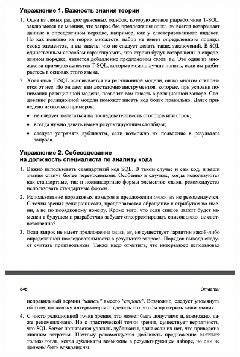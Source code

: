 \begin{figure}[h!]
	\begin{center}
		\includegraphics[width=0.9\textwidth]{img/eans1.png}
	\end{center}
	\captionsetup{justification=centering}
\end{figure}